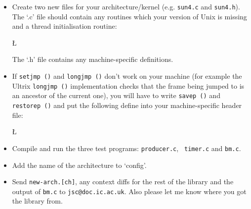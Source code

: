 \begin{itemize}
\item Create two new files for your architecture/kernel (e.g. {\tt sun4.c}
and {\tt sun4.h}). 
The `.c' file should contain any routines which your version of {\sc Unix} is
missing and a thread initialisation routine:
\begin{tgrind}
\L{\LB{}}
\end{tgrind}
The `.h' file contains any machine-specific definitions.
\item If {\tt setjmp ()} and {\tt longjmp ()} don't work on your machine
(for example the {\sc Ultrix} {\tt longjmp ()} implementation checks that
the frame being jumped to is an ancestor of the current one), you will
have to write {\tt savep ()} and {\tt restorep ()} and put the following
define into your machine-specific header file:
\begin{tgrind}
\L{\LB{}}
\end{tgrind}
\item Compile and run the three test programs: {\tt producer.c}, {\tt
timer.c} and {\tt bm.c}.
\item Add the name of the architecture to `config'.
\item Send {\tt new-arch.[ch]}, any context diffs for the rest of the
library and the output of {\tt bm.c} to {\tt jsc@doc.ic.ac.uk}.  Also
please let me know where you got the library from.
\end{itemize}

